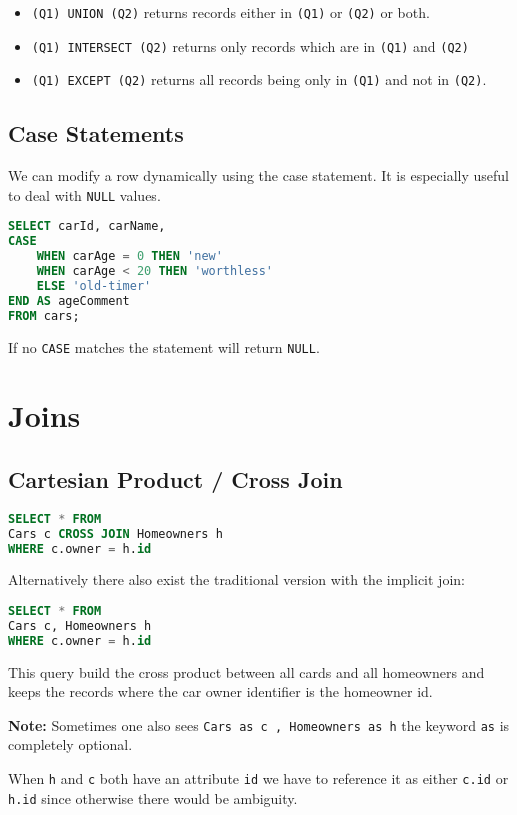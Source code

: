 \documentclass{sciposter}
\renewcommand{\t}[1]{\texttt{#1}}
\begin{document}
\begin{multicols}{3}
\begin{itemize}
	\item \t{(Q1) UNION (Q2)} returns records either in \t{(Q1)} or \t{(Q2)} or both.
	\item \t{(Q1) INTERSECT (Q2)} returns only records which are in \t{(Q1)} and \t{(Q2)}
	\item \t{(Q1) EXCEPT (Q2)} returns all records being only in \t{(Q1)} and not in \t{(Q2)}.
\end{itemize}


\subsection*{Case Statements}
We can modify a row dynamically using the case statement. It is especially useful to deal with \t{NULL} values.
\begin{lstlisting}[language=SQL]
SELECT carId, carName,
CASE
	WHEN carAge = 0 THEN 'new'
	WHEN carAge < 20 THEN 'worthless'
	ELSE 'old-timer'
END AS ageComment
FROM cars; 
\end{lstlisting}
If no \t{CASE} matches the statement will return \t{NULL}.
\section*{Joins}

\subsection*{Cartesian Product / Cross Join}

\begin{lstlisting}[language=SQL]
SELECT * FROM 
Cars c CROSS JOIN Homeowners h
WHERE c.owner = h.id
\end{lstlisting}

Alternatively there also exist the traditional version with the implicit join:

\begin{lstlisting}[language=SQL]
SELECT * FROM 
Cars c, Homeowners h
WHERE c.owner = h.id
\end{lstlisting}

This query build the cross product between all cards and all homeowners and keeps the records where the car owner identifier is the homeowner id.

\textbf{Note:} Sometimes one also sees \t{Cars as c , Homeowners as h} the keyword \t{as} is completely optional.


When \t{h} and \t{c} both have an attribute \t{id} we have to reference it as either \t{c.id} or \t{h.id} since otherwise there would be ambiguity.


\end{multicols}
\end{document}
